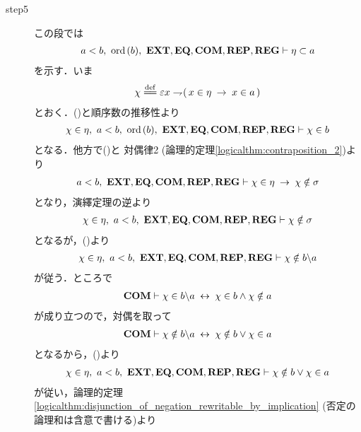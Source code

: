 \begin{prf}
\begin{description}
			\item[step5] この段では
				\begin{align}
					a < b,\ \ord{b},\ \EXTAX,\EQAX,\COMAX,\REPAX,\REGAX \vdash \eta \subset a
				\end{align}
				を示す．いま
				\begin{align}
					\chi \defeq \varepsilon x \negation (\, x \in \eta \rarrow x \in a\, )
				\end{align}
				とおく．()と順序数の推移性より
				\begin{align}
					\chi \in \eta,\ a < b,\ \ord{b},\ \EXTAX,\EQAX,\COMAX,\REPAX,\REGAX \vdash \chi \in b
					\label{fom:element_and_proper_subset_correspond_17}
				\end{align}
				となる．他方で()と
				対偶律2 (論理的定理\ref{logicalthm:contraposition_2})より
				\begin{align}
					a < b,\ \mbox{{\bf EXT}},\mbox{{\bf EQ}},\mbox{\bf COM},\mbox{{\bf REP}},\mbox{{\bf REG}} \vdash 
					\chi \in \eta \hspace{0.25em}\rightarrow\hspace{0.25em} \chi \notin \sigma
				\end{align}
				となり，演繹定理の逆より
				\begin{align}
					\chi \in \eta,\ a < b,\ \EXTAX,\EQAX,\COMAX,\REPAX,\REGAX \vdash \chi \notin \sigma
				\end{align}
				となるが，()より
				\begin{align}
					\chi \in \eta,\ a < b,\ \EXTAX,\EQAX,\COMAX,\REPAX,\REGAX \vdash \chi \notin b \backslash a
					\label{fom:element_and_proper_subset_correspond_18}
				\end{align}
				が従う．ところで
				\begin{align}
					\mbox{\bf COM} \vdash \chi \in b \backslash a \hspace{0.25em}\leftrightarrow\hspace{0.25em} \chi \in b \wedge \chi \notin a
				\end{align}
				が成り立つので，対偶を取って
				\begin{align}
					\mbox{\bf COM} \vdash \chi \notin b \backslash a \hspace{0.25em}\leftrightarrow\hspace{0.25em} \chi \notin b \vee \chi \in a
				\end{align}
				となるから，()より
				\begin{align}
					\chi \in \eta,\ a < b,\ \EXTAX,\EQAX,\COMAX,\REPAX,\REGAX \vdash \chi \notin b \vee \chi \in a
				\end{align}
				が従い，論理的定理\ref{logicalthm:disjunction_of_negation_rewritable_by_implication}
				(否定の論理和は含意で書ける)より

\end{description}
\end{prf}
